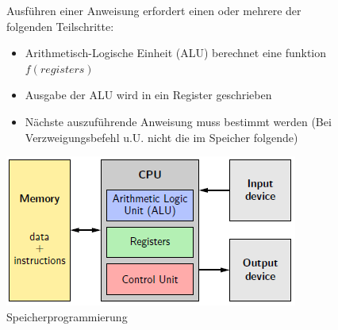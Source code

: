 \documentclass[12pt]{report}
\begin{document}
\begin{figure}[H]
  \begin{minipage}[t]{0.48\textwidth}
    Ausführen einer Anweisung erfordert einen oder mehrere der folgenden Teilschritte:
    \begin{itemize}
      \item Arithmetisch-Logische Einheit (ALU) berechnet eine funktion $f(registers)$
      \item Ausgabe der ALU wird in ein Register geschrieben
      \item Nächste auszuführende Anweisung muss bestimmt werden (Bei Verzweigungsbefehl u.U. nicht die im Speicher folgende)
    \end{itemize}
  \end{minipage}
  \hfill
  \begin{minipage}[t]{0.48\textwidth}
    \caption{Speicherprogrammierung}
    \centering
    \includegraphics[width=\textwidth]{speicherprogrammierung_diagramm}
  \end{minipage}
\end{figure}
\end{document}

